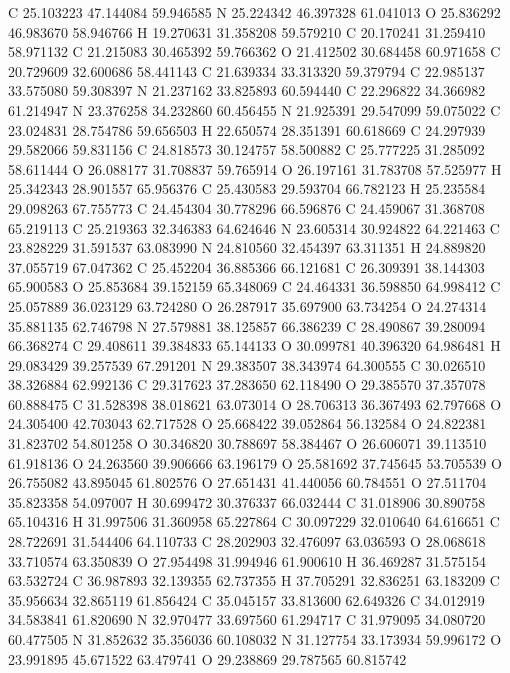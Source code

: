 \documentclass{article}
\begin{document}
C 25.103223 47.144084 59.946585 
N 25.224342 46.397328 61.041013 
O 25.836292 46.983670 58.946766 
H 19.270631 31.358208 59.579210 
C 20.170241 31.259410 58.971132 
C 21.215083 30.465392 59.766362 
O 21.412502 30.684458 60.971658 
C 20.729609 32.600686 58.441143 
C 21.639334 33.313320 59.379794 
C 22.985137 33.575080 59.308397 
N 21.237162 33.825893 60.594440 
C 22.296822 34.366982 61.214947 
N 23.376258 34.232860 60.456455 
N 21.925391 29.547099 59.075022 
C 23.024831 28.754786 59.656503 
H 22.650574 28.351391 60.618669 
C 24.297939 29.582066 59.831156 
C 24.818573 30.124757 58.500882 
C 25.777225 31.285092 58.611444 
O 26.088177 31.708837 59.765914 
O 26.197161 31.783708 57.525977 
H 25.342343 28.901557 65.956376 
C 25.430583 29.593704 66.782123 
H 25.235584 29.098263 67.755773 
C 24.454304 30.778296 66.596876 
C 24.459067 31.368708 65.219113 
C 25.219363 32.346383 64.624646 
N 23.605314 30.924822 64.221463 
C 23.828229 31.591537 63.083990 
N 24.810560 32.454397 63.311351 
H 24.889820 37.055719 67.047362 
C 25.452204 36.885366 66.121681 
C 26.309391 38.144303 65.900583 
O 25.853684 39.152159 65.348069 
C 24.464331 36.598850 64.998412 
C 25.057889 36.023129 63.724280 
O 26.287917 35.697900 63.734254 
O 24.274314 35.881135 62.746798 
N 27.579881 38.125857 66.386239 
C 28.490867 39.280094 66.368274 
C 29.408611 39.384833 65.144133 
O 30.099781 40.396320 64.986481 
H 29.083429 39.257539 67.291201 
N 29.383507 38.343974 64.300555 
C 30.026510 38.326884 62.992136 
C 29.317623 37.283650 62.118490 
O 29.385570 37.357078 60.888475 
C 31.528398 38.018621 63.073014 
O 28.706313 36.367493 62.797668 
O 24.305400 42.703043 62.717528 
O 25.668422 39.052864 56.132584 
O 24.822381 31.823702 54.801258 
O 30.346820 30.788697 58.384467 
O 26.606071 39.113510 61.918136 
O 24.263560 39.906666 63.196179 
O 25.581692 37.745645 53.705539 
O 26.755082 43.895045 61.802576 
O 27.651431 41.440056 60.784551 
O 27.511704 35.823358 54.097007 
H 30.699472 30.376337 66.032444 
C 31.018906 30.890758 65.104316 
H 31.997506 31.360958 65.227864 
C 30.097229 32.010640 64.616651 
C 28.722691 31.544406 64.110733 
C 28.202903 32.476097 63.036593 
O 28.068618 33.710574 63.350839 
O 27.954498 31.994946 61.900610 
H 36.469287 31.575154 63.532724 
C 36.987893 32.139355 62.737355 
H 37.705291 32.836251 63.183209 
C 35.956634 32.865119 61.856424 
C 35.045157 33.813600 62.649326 
C 34.012919 34.583841 61.820690 
N 32.970477 33.697560 61.294717 
C 31.979095 34.080720 60.477505 
N 31.852632 35.356036 60.108032 
N 31.127754 33.173934 59.996172 
O 23.991895 45.671522 63.479741 
O 29.238869 29.787565 60.815742 
\end{document}
